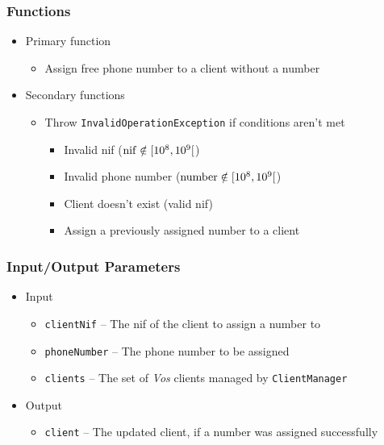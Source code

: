 \subsubsection{Functions}
\label{sec:methods.assignPhoneNumber.functions}
\begin{itemize}
  \item Primary function
  \begin{itemize}
    \small
    \item Assign free phone number to a client without a number
  \end{itemize}
  \item Secondary functions
  \begin{itemize}
    \small
    \item Throw \texttt{InvalidOperationException} if conditions aren't met
      \begin{itemize}
        \footnotesize
        \item Invalid nif ($\rm{nif} \notin [10^8,10^9[$)
        \item Invalid phone number ($\rm{number} \notin [10^8,10^9[$)
        \item Client doesn't exist (valid nif)
        \item Assign a previously assigned number to a client
      \end{itemize}
  \end{itemize}
\end{itemize}

\subsubsection{Input/Output Parameters}
\label{sec:methods.assignPhoneNumber.params}
\begin{itemize}
  \normalsize
  \item Input
  \begin{itemize}
    \small
    \item \texttt{clientNif} -- The nif of the client to assign a number to
    \item \texttt{phoneNumber} -- The phone number to be assigned
    \item \texttt{clients} -- The set of \textit{Vos} clients managed by
          \texttt{ClientManager}
  \end{itemize}
  \item Output
  \begin{itemize}
    \normalsize
    \item \texttt{client} -- The updated client, if a number was assigned
          successfully
  \end{itemize}
\end{itemize}

